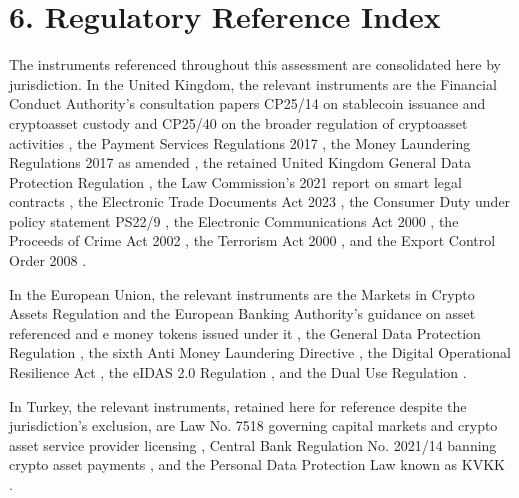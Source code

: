 \documentclass[12pt, a4paper]{article}
\begin{document}
\section*{6. Regulatory Reference Index}

The instruments referenced throughout this assessment are consolidated here by
jurisdiction. In the United Kingdom, the relevant instruments are the Financial Conduct
Authority's consultation papers CP25/14 on stablecoin issuance and cryptoasset custody and
CP25/40 on the broader regulation of cryptoasset activities \citep{fcacp2514, fcacp2540},
the Payment Services Regulations 2017 \citep{ukpsr2017}, the Money Laundering Regulations
2017 as amended \citep{mlr2017}, the retained United Kingdom General Data Protection
Regulation \citep{gdpr2016}, the Law Commission's 2021 report on smart legal contracts
\citep{lawcommission2021}, the Electronic Trade Documents Act 2023 \citep{etda2023}, the
Consumer Duty under policy statement PS22/9 \citep{fcaconsumerduty}, the Electronic
Communications Act 2000 \citep{ukeca2000}, the Proceeds of Crime Act 2002
\citep{poca2002}, the Terrorism Act 2000 \citep{terrorismact2000}, and the Export Control
Order 2008 \citep{ukeco2008}.

In the European Union, the relevant instruments are the Markets in Crypto Assets
Regulation \citep{mica2023} and the European Banking Authority's guidance on asset
referenced and e money tokens issued under it \citep{ebamica}, the General Data Protection
Regulation \citep{gdpr2016}, the sixth Anti Money Laundering Directive \citep{amld6}, the
Digital Operational Resilience Act \citep{dora2022}, the eIDAS 2.0 Regulation
\citep{eidas2024}, and the Dual Use Regulation \citep{eudualuse2021}.

In Turkey, the relevant instruments, retained here for reference despite the
jurisdiction's exclusion, are Law No. 7518 governing capital markets and crypto asset
service provider licensing \citep{cmblaw7518}, Central Bank Regulation No. 2021/14
banning crypto asset payments \citep{cbrt202114}, and the Personal Data Protection Law
known as KVKK \citep{kvkk6698}.
\end{document}
